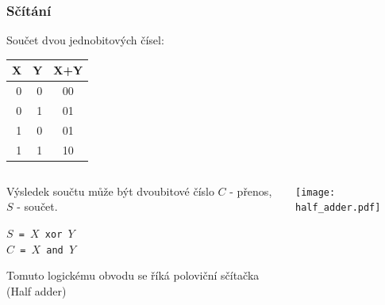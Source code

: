 \documentclass{beamer}
\begin{document}
\begin{frame}
\frametitle{Sčítání}

Součet dvou jednobitových čísel:
\begin{tabular}{|r|r|c|}\hline
X & Y & X+Y\\ \hline
0 & 0 & 00\\ \hline
0 & 1 & 01\\ \hline
1 & 0 & 01\\ \hline
1 & 1 & 10\\ \hline
\end{tabular}

\bigskip

\begin{columns}
\begin{column}{0.55\textwidth}
Výsledek součtu může být dvoubitové číslo $C$ - přenos, $S$ - součet.
\bigskip

\texttt{$S$ = $X$ xor $Y$}\\
\texttt{$C$ = $X$ and $Y$}

\bigskip

Tomuto logickému obvodu se říká poloviční sčítačka (Half adder)
\end{column}
\begin{column}{0.45\textwidth}  
\begin{center}
   \texttt{[image: half\_adder.pdf]}
\end{center}
\end{column}
\end{columns}

\end{frame}
\end{document}
